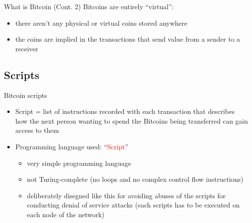 \documentclass{beamer}
\newcommand\red[1]{\textcolor{red}{#1}}
\begin{document}
  \begin{frame}{What is Bitcoin (Cont. 2)}
    Bitcoins are entirely ``virtual'':
    \begin{itemize}
      \item there aren't any physical or virtual coins stored anywhere \pause
      \item the coins are implied in the transactions that send value from a sender to
      a receiver
    \end{itemize}
  \end{frame}





  \subsection{Scripts}
  \begin{frame}{Bitcoin scripts}
    \begin{itemize}
      \item Script = list of instructions recorded with each transaction that describes
      how the next person wanting to spend the Bitcoins being transferred can
      gain access to them \pause
      \item Programming language used: ``\red{Script}'' \cite{script-bitcoin-wiki} \pause
      \begin{itemize}
        \item very simple programming language \pause
        \item not Turing-complete {\tiny(no loops and no complex control flow instructions)} \pause
        \item deliberately disegned like this for avoiding abuses of the scripts
        for conducting denial of service attacks {\tiny(each scripts has to be
        executed on each node of the network)}
      \end{itemize}
    \end{itemize}
  \end{frame}
\end{document}
